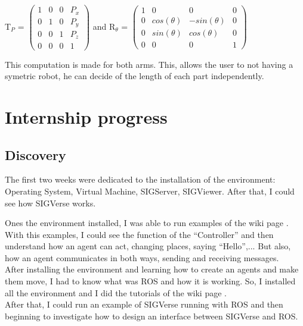 T$_{P}$ =
$\begin{pmatrix}
   1 & 0 & 0 & P_x \\
   0 & 1 & 0 & P_y \\
   0 & 0 & 1 & P_z \\
   0 & 0 & 0 & 1
\end{pmatrix}$ and 
R$_{\theta}$ = 
$\begin{pmatrix}
   1 & 0 & 0 & 0 \\
   0 & cos(\theta) & -sin(\theta) & 0 \\
   0 & sin(\theta) & cos(\theta) & 0 \\
   0 & 0 & 0 & 1
\end{pmatrix}$

This computation is made for both arms. This, allows the user to not having a symetric robot, he can decide of the length of each part independently.

\section{Internship progress}
\subsection{Discovery}
The first two weeks were dedicated to the installation of the environment: Operating System, Virtual Machine, SIGServer, SIGViewer. After that, I could see how SIGVerse works. 

Ones the environment installed, I was able to run examples of the wiki page \cite{SIGVerseWiki}. With this examples, I could see the function of the ``Controller'' and then understand how an agent can act, changing places, saying ``Hello'',... But also, how an agent communicates in both ways, sending and receiving messages.\\

After installing the environment and learning how to create an agents and make them move, I had to know what was ROS and how it is working. So, I installed all the environment and I did the tutorials of the wiki page \cite{ROSWiki}.\\
After that, I could run an example of SIGVerse running with ROS and then beginning to investigate how to design an interface between SIGVerse and ROS.


